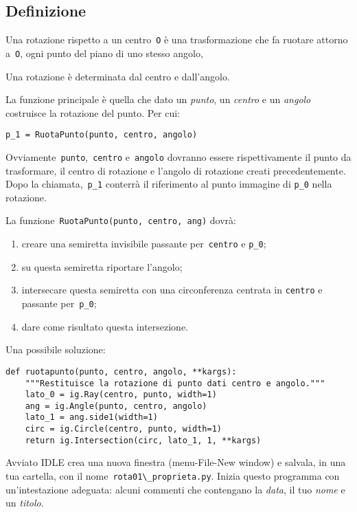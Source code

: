 \subsection{Definizione}

Una rotazione rispetto a un centro~\lstinline{O} è una trasformazione che fa
ruotare attorno a~\lstinline{O}, ogni punto del piano di uno stesso angolo,

Una rotazione è determinata dal centro e dall'angolo.

La funzione principale è quella che dato un \emph{punto}, un \emph{centro}
e un \emph{angolo} costruisce la rotazione del punto. Per cui:

\begin{lstlisting}
p_1 = RuotaPunto(punto, centro, angolo)
\end{lstlisting}

Ovviamente~\lstinline{punto},~\lstinline{centro} e~\lstinline{angolo} dovranno 
essere rispettivamente il punto da trasformare, il centro di rotazione
e l'angolo di rotazione creati precedentemente.
Dopo la chiamata,~\lstinline{p_1} conterrà il riferimento al punto immagine di
\lstinline{p_0} nella rotazione.

La funzione~\lstinline{RuotaPunto(punto, centro, ang)} dovrà:

\begin{enumerate} [noitemsep]
\item creare una semiretta invisibile passante per~\lstinline{centro} e 
\lstinline{p_0};
\item su questa semiretta riportare l'angolo;
\item intersecare questa semiretta con una circonferenza centrata in 
\lstinline{centro}
e passante per~\lstinline{p_0};
\item dare come risultato questa intersezione.

\end{enumerate}

Una possibile soluzione:

\begin{lstlisting}
def ruotapunto(punto, centro, angolo, **kargs):
    """Restituisce la rotazione di punto dati centro e angolo."""
    lato_0 = ig.Ray(centro, punto, width=1)
    ang = ig.Angle(punto, centro, angolo)
    lato_1 = ang.side1(width=1)
    circ = ig.Circle(centro, punto, width=1)
    return ig.Intersection(circ, lato_1, 1, **kargs)
\end{lstlisting}

Avviato IDLE crea una nuova finestra (menu-File-New window) e salvala,
in una tua cartella, con il nome~\lstinline{rota01\_proprieta.py}.
Inizia questo programma con un'intestazione adeguata: alcuni commenti che 
contengano la \emph{data}, il tuo \emph{nome} e un \emph{titolo}.

